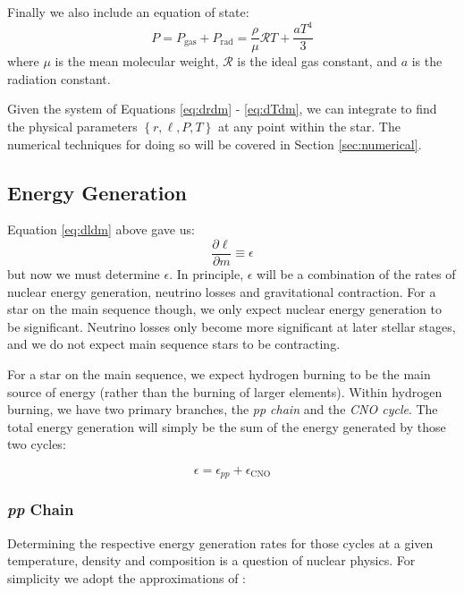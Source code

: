 Finally we also include an equation of state:
\begin{equation}
  P = P_{\mathrm{gas}} + P_\mathrm{rad} = \frac{\rho}{\mu}\mathcal{R} T + \frac{a T^4}{3} 
  \label{eq:EOS}
\end{equation}
where $\mu$ is the mean molecular weight, $\mathcal{R}$ is the ideal gas constant, and $a$ is the radiation constant.

Given the system of Equations \ref{eq:drdm} - \ref{eq:dTdm}, we can integrate to find the physical parameters $\left\{ r, \ell, P, T \right\}$ at any point within the star.  The numerical techniques for doing so will be covered in Section \ref{sec:numerical}.

\subsection{Energy Generation}
\label{sec:theory:energy}

Equation \ref{eq:dldm} above gave us:
\begin{equation*}
    \frac{\partial \ell}{\partial m} \equiv \epsilon 
\end{equation*}
but now we must determine $\epsilon$.  In principle, $\epsilon$ will be a combination of the rates of nuclear energy generation, neutrino losses and gravitational contraction.  For a star on the main sequence though, we only expect nuclear energy generation to be significant.  Neutrino losses only become more significant at later stellar stages, and we do not expect main sequence stars to be contracting.

For a star on the main sequence, we expect hydrogen burning to be the main source of energy (rather than the burning of larger elements).  Within hydrogen burning, we have two primary branches, the \emph{pp chain} and the \emph{CNO cycle}.  The total energy generation will simply be the sum of the energy generated by those two cycles:

\begin{equation}
  \epsilon = \epsilon_{pp} + \epsilon_{\mathrm{CNO}}
  \label{eq:epsilon:ppCNO}
\end{equation}

\subsubsection{\emph{pp} Chain}
Determining the respective energy generation rates for those cycles at a given temperature, density and composition is a question of nuclear physics.  For simplicity we adopt the approximations of \cite{Angulo}:

